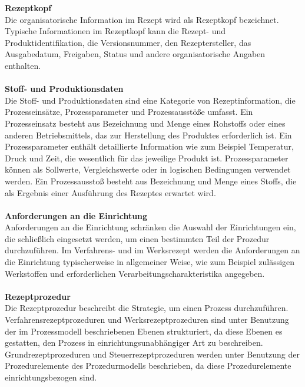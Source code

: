 \textbf{Rezeptkopf}\\
Die organisatorische Information im Rezept wird als Rezeptkopf bezeichnet. Typische Informationen im Rezeptkopf kann die Rezept- und Produktidentifikation, die Versionsnummer, den Rezeptersteller, das Ausgabedatum, Freigaben, Status und andere organisatorische Angaben enthalten.
\\\\
\textbf{Stoff- und Produktionsdaten}\\
Die Stoff- und Produktionsdaten sind eine Kategorie von Rezeptinformation, die Prozesseinsätze, Prozessparameter und Prozessausstöße umfasst.
Ein Prozesseinsatz besteht aus Bezeichnung und Menge eines Rohstoffs oder eines anderen Betriebsmittels, das zur Herstellung des Produktes erforderlich ist.
Ein Prozessparameter enthält detaillierte Information wie zum Beispiel Temperatur, Druck und Zeit, die wesentlich für das jeweilige Produkt ist.  Prozessparameter können als Sollwerte, Vergleichswerte oder in logischen Bedingungen verwendet werden.
Ein Prozessausstoß besteht aus Bezeichnung und Menge eines Stoffs, die als Ergebnis einer Ausführung des Rezeptes erwartet wird.
\\\\
\textbf{Anforderungen an die Einrichtung}\\
Anforderungen an die Einrichtung schränken die Auswahl der Einrichtungen ein, die schließlich eingesetzt werden, um einen bestimmten Teil der Prozedur durchzuführen. Im Verfahrens- und im Werksrezept werden die Anforderungen an die Einrichtung typischerweise in allgemeiner Weise, wie zum Beispiel zulässigen Werkstoffen und erforderlichen Verarbeitungscharakteristika angegeben.
\\\\
\textbf{Rezeptprozedur}\\
Die Rezeptprozedur beschreibt die Strategie, um einen Prozess durchzuführen. Verfahrensrezeptprozeduren und Werksrezeptprozeduren sind unter Benutzung der im Prozessmodell beschriebenen Ebenen strukturiert, da diese Ebenen es gestatten, den Prozess in einrichtungsunabhängiger Art zu beschreiben. Grundrezeptprozeduren und Steuerrezeptprozeduren werden unter Benutzung der Prozedurelemente des Prozedurmodells beschrieben, da diese Prozedurelemente einrichtungsbezogen sind.

